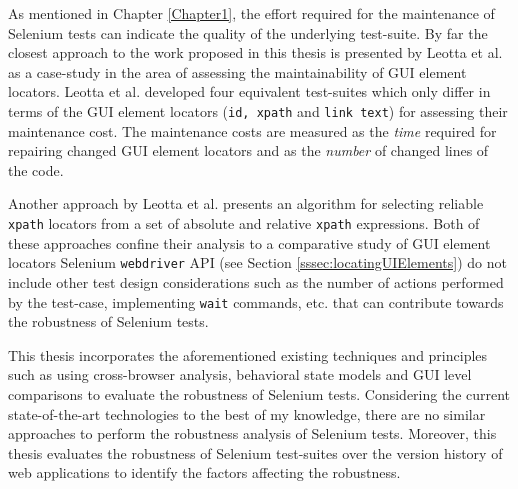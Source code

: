 As mentioned in Chapter \ref{Chapter1}, the effort required for the maintenance of Selenium tests can indicate the quality of the underlying test-suite. By far the closest approach to the work proposed in this thesis is presented by Leotta et al. \cite{leotta2013comparing} as a case-study in the area of assessing the maintainability of GUI element locators. Leotta et al. developed four equivalent test-suites which only differ in terms of the GUI element locators (\texttt{id, xpath} and \texttt{link text}) for assessing their maintenance cost. The maintenance costs are measured as the \textit{time} required for repairing changed GUI element locators and as the \textit{number} of changed lines of the code. 

Another approach by Leotta et al. \cite{leotta2014reducing} presents an algorithm for selecting reliable \texttt{xpath} locators from a set of absolute and relative \texttt{xpath} expressions. 
Both of these approaches confine their analysis to a comparative study of GUI element locators Selenium \texttt{webdriver} API (see Section \ref{sssec:locatingUIElements}) do not include other test design considerations such as the number of actions performed by the test-case, implementing \texttt{wait} commands, etc. that can contribute towards the robustness of Selenium tests. 

This thesis incorporates the aforementioned existing techniques and principles such as using cross-browser analysis, behavioral state models and GUI level comparisons to evaluate the robustness of Selenium tests. Considering the current state-of-the-art technologies to the best of my knowledge, there are no similar approaches to perform the robustness analysis of Selenium tests. Moreover, this thesis evaluates the robustness of Selenium test-suites over the version history of web applications to identify the factors affecting the robustness. 

